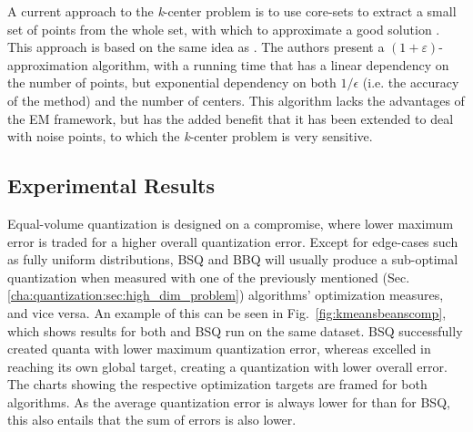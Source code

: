			A current approach to the \textit{k}-center problem is to use core-sets to extract a small set of points from the whole set, with which to approximate a good solution \cite{badoiu_approximate}.
			This approach is based on the same idea as \cite{kumar}.
			The authors present a $(1+\varepsilon)$-approximation algorithm, with a running time that has a linear dependency on the number of points, but exponential dependency on both $1/\epsilon$ (i.e. the accuracy of the method) and the number of centers.
			This algorithm lacks the advantages of the \ac{EM} framework, but has the added benefit that it has been extended to deal with noise points, to which the \textit{k}-center problem is very sensitive.
			
		\subsection{Experimental Results}
			
			Equal-volume quantization is designed on a compromise, where lower maximum error is traded for a higher overall quantization error.
			Except for edge-cases such as fully uniform distributions, \ac{BSQ} and \ac{BBQ} will usually produce a sub-optimal quantization when measured with one of the previously mentioned (Sec. \ref{cha:quantization:sec:high_dim_problem}) algorithms' optimization measures, and vice versa.
			An example of this can be seen in Fig.~\ref{fig:kmeansbeanscomp}, which shows results for both \kmeans{} and \ac{BSQ} run on the same dataset.
			\ac{BSQ} successfully created quanta with lower maximum quantization error, whereas \kmeans{} excelled in reaching its own global target, creating a quantization with lower overall error.
			The charts showing the respective optimization targets are framed for both algorithms.
			As the average quantization error is always lower for \kmeans{} than for \ac{BSQ}, this also entails that the sum of errors is also lower.
			
